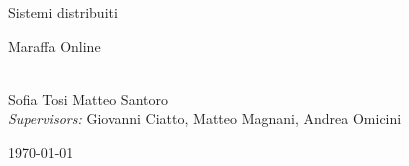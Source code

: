 \documentclass[a4paper,11pt,oneside]{book}
\begin{document}
    
    \frontmatter
    
    \begin{titlepage}      
        \begin{center}
            {\LARGE Sistemi distribuiti}\\[2cm]
			
            \linespread{1.2}\huge {
                Maraffa Online
            
            }
            \linespread{1}~\\[2cm]
            {\Large 
                Sofia Tosi
                Matteo Santoro 
            }\\[1cm] 
            

            {\large 
                \emph{Supervisors:} 
                Giovanni Ciatto,
                Matteo Magnani,
                Andrea Omicini
                }\\[1cm] %
            \vfill
            
            
            \today %
        \end{center}
    \end{titlepage}
    
        
    
    \tableofcontents
    \listoffigures
    \listoftables
    
    \mainmatter
    
\end{document}
